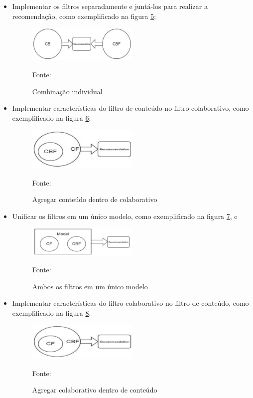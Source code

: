 \begin{itemize}
    \item Implementar os filtros separadamente e juntá-los para realizar a recomendação, como exemplificado na figura
    \hyperref[fig:combind]{5};
    \begin{figure}[htbp]
        \centering
        \includegraphics[width=0.5\textwidth]{figuras/combind.eps}
        \caption{Combinação individual}
        \label{fig:combind}
        \small Fonte: \cite{thorat2015survey}
    \end{figure}

    \item Implementar características do filtro de conteúdo no filtro colaborativo, como exemplificado na figura
    \hyperref[fig:cfcbf]{6};
    \begin{figure}[htbp]
        \centering
        \includegraphics[width=0.5\textwidth]{figuras/cfcbf.eps}
        \caption{Agregar conteúdo dentro de colaborativo}
        \label{fig:cfcbf}
        \small Fonte: \cite{thorat2015survey}
    \end{figure}

    \item Unificar os filtros em um único modelo, como exemplificado na figura
    \hyperref[fig:modelounico]{7}, e
    \begin{figure}[htbp]
        \centering
        \includegraphics[width=0.5\textwidth]{figuras/modelounico.eps}
        \caption{Ambos os filtros em um único modelo}
        \label{fig:modelounico}
        \small Fonte: \cite{thorat2015survey}
    \end{figure}

    \item Implementar características do filtro colaborativo no filtro de conteúdo, como exemplificado na figura
    \hyperref[fig:cbfcf]{8}.
    \begin{figure}[htbp]
        \centering
        \includegraphics[width=0.5\textwidth]{figuras/cbfcf.eps}
        \caption{Agregar colaborativo dentro de conteúdo}
        \label{fig:cbfcf}
        \small Fonte: \cite{thorat2015survey}
    \end{figure}
\end{itemize}

